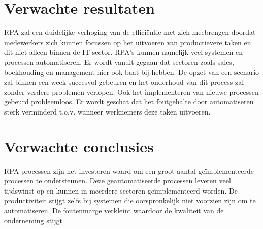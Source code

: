 \section{Verwachte resultaten}
\label{sec:verwachte_resultaten}
RPA zal een duidelijke verhoging van de efficiëntie met zich meebrengen doordat medewerkers zich kunnen focussen op het uitvoeren van productievere taken en dit niet alleen binnen de IT sector. RPA's kunnen namelijk veel systemen en processen automatiseren. Er wordt vanuit gegaan dat sectoren zoals sales, boekhouding en management hier ook baat bij hebben. De opzet van een scenario zal binnen een week succesvol gebeuren en het onderhoud van dit process zal zonder verdere problemen verlopen. Ook het implementeren van nieuwe processen gebeurd probleemloos. Er wordt geschat dat het foutgehalte door automatiseren sterk verminderd t.o.v. wanneer werknemers deze taken uitvoeren.

\section{Verwachte conclusies}
\label{sec:verwachte_conclusies}
RPA processen zijn het investeren waard om een groot aantal geïmplementeerde processen te ondersteunen. Deze geautomatiseerde processen leveren veel tijdswinst op en kunnen in meerdere sectoren geïmplementeerd worden. De productiviteit stijgt zelfs bij systemen die oorspronkelijk niet voorzien zijn om te automatiseren.  De foutenmarge verkleint waardoor de kwaliteit van de onderneming stijgt.

